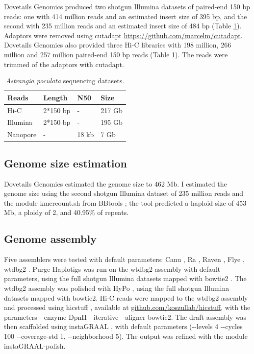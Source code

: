 Dovetails Genomics produced two shotgun Illumina datasets of paired-end 150 bp reads: one with 414 million reads and an estimated insert size of 395 bp, and the second with 235 million reads and an estimated insert size of 484 bp (Table \ref{tab:apoculata_datasets}). Adaptors were removed using cutadapt \url{https://github.com/marcelm/cutadapt}. \\

Dovetails Genomics also provided three Hi-C libraries with 198 million, 266 million and 257 million paired-end 150 bp reads (Table \ref{tab:apoculata_datasets}). The reads were trimmed of the adaptors with cutadapt.\\

\begin{table}[H]
\centering
\caption{\textit{Astrangia poculata} sequencing datasets.}
\begin{tabular}{|l|l|l|l|}
\hline
\textbf{Reads} & \textbf{Length} & \textbf{N50} & \textbf{Size} \\
\hline
Hi-C & 2*150 bp & - & 217 Gb \\
Illumina & 2*150 bp & - & 195 Gb\\
Nanopore & - & 18 kb & 7 Gb \\
\hline
\end{tabular}
\label{tab:apoculata_datasets}
\end{table}

\subsection{Genome size estimation}

Dovetails Genomics estimated the genome size to 462 Mb. I estimated the genome size using the second shotgun Illumina dataset of 235 million reads and the module kmercount.sh from BBtools \cite{bbtools}; the tool predicted a haploid size of 453 Mb, a ploidy of 2, and 40.95\% of repeats. 

\subsection{Genome assembly}

Five assemblers were tested with default parameters: Canu \cite{canu}, Ra \cite{ra}, Raven \cite{raven}, Flye \cite{flye}, wtdbg2 \cite{wtdbg2}. Purge Haplotigs \cite{purge_haplotigs} was run on the wtdbg2 assembly with default parameters, using the full shotgun Illumina datasets mapped with bowtie2 \cite{bowtie2}. The wtdbg2 assembly was polished with HyPo \cite{hypo}, using the full shotgun Illumina datasets mapped with bowtie2. Hi-C reads were mapped to the wtdbg2 assembly and processed using hicstuff \cite{hicstuff}, available at \url{github.com/koszullab/hicstuff}, with the parameters -{}-enzyme DpnII -{}-iterative -{}-aligner bowtie2. The draft assembly was then scaffolded using instaGRAAL \cite{instagraal}, with default parameters (-{}-levels 4 -{}-cycles 100 -{}-coverage-std 1, -{}-neighborhood 5). The output was refined with the module instaGRAAL-polish. \\

